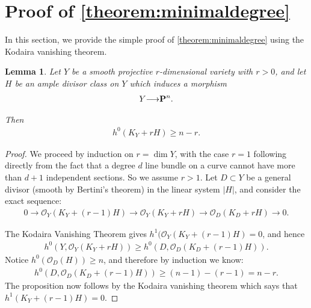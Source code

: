\documentclass[11pt,reqno]{amsart}
\theoremstyle{plain}
\newtheorem{lemma}[theorem]{Lemma}
\theoremstyle{definition}
\theoremstyle{remark}
\numberwithin{equation}{section}
\renewcommand{\to}{{\longrightarrow}}
\numberwithin{equation}{section}
\renewcommand{\O}{\mathcal O}
\begin{document}












\section{Proof of \autoref{theorem:minimaldegree}} %
\label{sec:proof_of_theorem:minimaldegree} 

In this section, we provide the simple proof of \autoref{theorem:minimaldegree} using the Kodaira vanishing theorem.


\begin{lemma}\label{lemma:KYmH}
  Let $Y$ be a  smooth projective $r$-dimensional variety with $r>0$, and let $H$ be an ample divisor class on $Y$ which induces a morphism 
  \begin{align*}
     Y \to \P^{n}.
   \end{align*} 

  Then 
  \begin{align*}
     h^{0}(K_{Y}+rH) \geq n-r.
   \end{align*} 
\end{lemma}

\begin{proof}
  We proceed by induction on $r = \dim Y$, with the case $r = 1$ following directly from the fact that a degree $d$ line bundle on a curve cannot have more than $d+1$ independent sections. So we assume $r>1$. Let $D \subset Y$ be a general divisor (smooth by Bertini's theorem)  in the linear system $|H|$, and consider the exact sequence: 
  \begin{align*}
    0 \to \O_{Y}(K_{Y}+(r-1)H) \to \O_{Y}(K_{Y}+rH) \to \O_{D}(K_{D}+rH) \to 0.
  \end{align*}

  The Kodaira Vanishing Theorem gives $h^{1}(\O_{Y}(K_{Y}+(r-1)H) = 0$, and hence
  \begin{align*}
     h^{0}(Y,\O_{Y}(K_{Y}+rH)) \geq h^{0}(D,\O_{D}(K_{D}+(r-1)H)). 
   \end{align*} 
   Notice  $h^{0}(\O_{D}(H)) \geq n$, and therefore by induction we know: 
   \begin{align*}
      h^{0}(D,\O_{D}(K_{D}+(r-1)H)) \geq (n-1)-(r-1) = n-r.
    \end{align*}
    The proposition now follows by the Kodaira vanishing theorem which says that $h^{1}(K_{Y} + (r-1)H) = 0$. 
\end{proof} 
\end{document}
